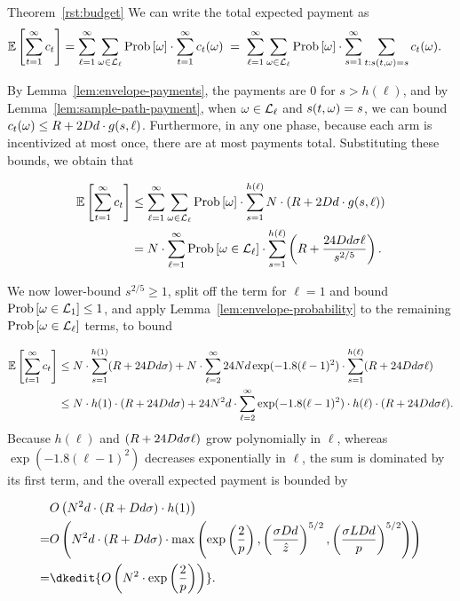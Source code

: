 \begin{extraproof}{Theorem~\ref{rst:budget}}
We can write the total expected payment as
\begin{align*}
  \Expect{\sum_{t=1}^{\infty} \PayA{t}}
& = \sum_{\ell = 1}^{\infty} \sum_{\SP \in \Env{\ell}}
  \Prob{\SP} \cdot \sum_{t=1}^{\infty} \PayA{t}(\SP)
\; = \; \sum_{\ell = 1}^{\infty} \sum_{\SP \in \Env{\ell}}
  \Prob{\SP} \cdot \sum_{s=1}^{\infty} \sum_{t: s(t,\SP) = s} \PayA{t}(\SP).
\end{align*}

By Lemma~\ref{lem:envelope-payments},
the payments are 0 for $s > h(\ell)$,
and by Lemma~\ref{lem:sample-path-payment},
when $\omega \in {\mathcal L}_{\ell}$ and $s(t,\omega) = s$, we can bound
$c_{t}(\omega) \leq R + 2 D d \cdot g(s,\ell)$.
Furthermore, in any one phase, because each arm is incentivized at
most once, there are at most \ARMNUM payments total.
Substituting these bounds, we obtain that

\begin{align*}
  \Expect{\sum_{t=1}^{\infty} \PayA{t}}
& \leq \sum_{\ell = 1}^{\infty} \sum_{\SP \in \Env{\ell}} \Prob{\SP} \cdot
  \sum_{s=1}^{h(\ell)} \ARMNUM \cdot (\MAXR + 2 \Diam d \cdot g(s,\ell))
\\ & = \ARMNUM \cdot
  \sum_{\ell = 1}^{\infty} \Prob{\SP \in \Env{\ell}} \cdot
  \sum_{s=1}^{h(\ell)} \left( \MAXR + \frac{24 \Diam d \sigma \ell}{s^{2/5}} \right).
\end{align*}

We now lower-bound $s^{2/5} \geq 1$, split off the term for $\ell=1$
and bound $\Prob{\SP \in \Env{1}} \leq 1$, and apply
Lemma~\ref{lem:envelope-probability} to the remaining
$\Prob{\SP \in \Env{\ell}}$ terms, to bound

\begin{align*}
\Expect{\sum_{t=1}^{\infty} \PayA{t}}
& \leq
\ARMNUM \cdot \sum_{s=1}^{h(1)} (\MAXR + 24 \Diam d \sigma)
+ \ARMNUM \cdot
  \sum_{\ell = 2}^{\infty} 24 \ARMNUM d\exp(-1.8(\ell-1)^2) \cdot
  \sum_{s=1}^{h(\ell)} (\MAXR + 24 \Diam d \sigma \ell)
\\ & \leq
\ARMNUM \cdot h(1) \cdot (\MAXR + 24 \Diam d \sigma)
+ 24 \ARMNUM^2 d \cdot \sum_{\ell = 2}^{\infty}
     \exp(-1.8(\ell-1)^2) \cdot h(\ell) \cdot (\MAXR + 24 \Diam d \sigma \ell).
\end{align*}
Because $h(\ell)$ and $(R + 24 D d \sigma \ell)$ grow
polynomially in $\ell$, whereas $\exp(-1.8(\ell-1)^2)$ decreases
exponentially in $\ell$, the sum is dominated by its first term, and
the overall expected payment is bounded by

\begin{align*}
& O \left(\ARMNUM^2 d \cdot (\MAXR + \Diam d \sigma) \cdot h(1)
  \right)
\\ = 
& O \left(\ARMNUM^2  d \cdot (\MAXR + \Diam d \sigma)\cdot
  \max \left( \exp \left(\frac{2}{\MinProb}\right),
		    \left( \frac{\sigma \Diam d}{\TieCutoff} \right)^{5/2},
    \left( \frac{\sigma \TieDensity \Diam d}{\MinProb} \right)^{5/2} \right)
\right)
\\ =
& \dkedit{O \left( \ARMNUM^2 \cdot \exp \left(\frac{2}{\MinProb} \right) \right)}.
\end{align*}
\end{extraproof}
